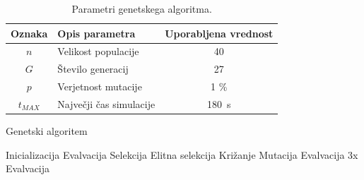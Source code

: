 \begin{table}[ht]
	\begin{center}
		\begin{tabular}{ c|l|c }
			\hline
			\textbf{Oznaka} & \textbf{Opis parametra} & \textbf{Uporabljena vrednost} \\ \hline  
			$n$ & Velikost populacije & 40 \\ 
			$G$ & Število generacij & 27 \\
			$p$ & Verjetnost mutacije & 1 \% \\
			$t_{MAX}$ & Največji čas simulacije & 180~s \\
			\hline
		\end{tabular}
	\end{center}
	\caption[Parametri genetskega algoritma]{Parametri genetskega algoritma.}
	\label{table:genetski}
\end{table}

\begin{algorithm}
	\caption{Genetski algoritem} 
	\begin{algorithmic}[1]
		\State Inicializacija
		\State Evalvacija
			\State Selekcija
			\Else
			\State Elitna selekcija
			\EndIf
			\State Križanje
			\State Mutacija
				\State Evalvacija
			\Else
				\State 3x Evalvacija
			\EndIf
		\EndFor
	\end{algorithmic} 
	\label{alg:genetski}
\end{algorithm}
